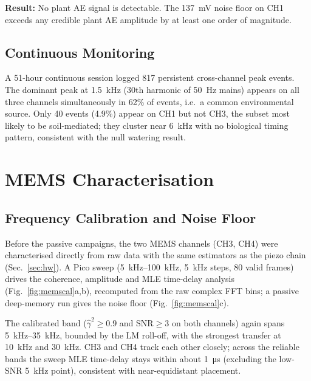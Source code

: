 \documentclass[10pt,a4paper,twocolumn]{article}
\newcommand{\gammasq}{\ensuremath{\hat{\gamma}^2}}
\begin{document}
\textbf{Result:} No plant AE signal is detectable. The \SI{137}{\milli\volt} noise floor on CH1 exceeds any credible plant AE amplitude by at least one order of magnitude.

\subsection{Continuous Monitoring}

A 51-hour continuous session logged 817 persistent cross-channel peak events. The dominant peak at \SI{1.5}{\kilo\hertz} (30th harmonic of \SI{50}{\hertz} mains) appears on all three channels simultaneously in 62\% of events, i.e.\ a common environmental source. Only 40 events (4.9\%) appear on CH1 but not CH3, the subset most likely to be soil-mediated; they cluster near \SI{6}{\kilo\hertz} with no biological timing pattern, consistent with the null watering result.

\section{MEMS Characterisation}
\label{sec:mems}

\subsection{Frequency Calibration and Noise Floor}
\label{sec:memscal}

Before the passive campaigns, the two MEMS channels (CH3, CH4) were characterised directly from raw data with the same estimators as the piezo chain (Sec.~\ref{sec:hw}). A Pico sweep (\SIrange{5}{100}{\kilo\hertz}, \SI{5}{\kilo\hertz} steps, 80 valid frames) drives the coherence, amplitude and MLE time-delay analysis (Fig.~\ref{fig:memscal}a,b), recomputed from the raw complex FFT bins; a passive deep-memory run gives the noise floor (Fig.~\ref{fig:memscal}c).

The calibrated band ($\gammasq\geq0.9$ and SNR${}\geq3$ on both channels) again spans \SIrange{5}{35}{\kilo\hertz}, bounded by the LM roll-off, with the strongest transfer at \SI{10}{\kilo\hertz} and \SI{30}{\kilo\hertz}. CH3 and CH4 track each other closely; across the reliable bands the sweep MLE time-delay stays within about \SI{1}{\micro\second} (excluding the low-SNR \SI{5}{\kilo\hertz} point), consistent with near-equidistant placement.
\end{document}
